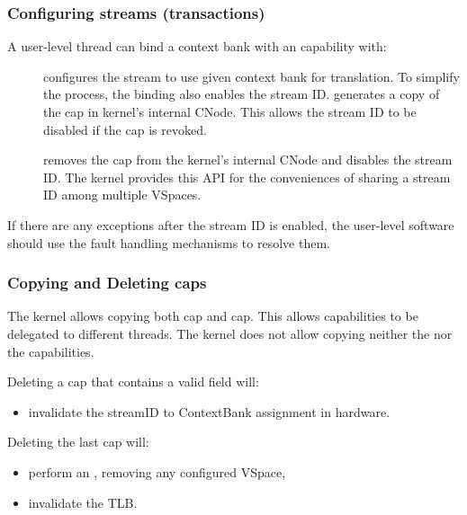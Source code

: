 \subsubsection{Configuring streams (transactions)}
\label{sec:smmuv2-configuring-streams-transactions}

A user-level thread can bind a context bank with an 
capability with:
\begin{description}
    \item[] configures the stream
        to use given context bank for translation. To simplify the process, the
        binding also enables the stream ID.  
        generates a copy of the  cap in kernel's internal
        CNode. This allows the stream ID to be disabled if the
         cap is revoked.
    \item[] removes the
         cap from the kernel's internal CNode and disables
        the stream ID. The kernel provides this API for the conveniences of
        sharing a stream ID among multiple VSpaces.
\end{description}

If there are any exceptions after the stream ID is enabled, the user-level
software should use the fault handling mechanisms to resolve them.



\subsubsection{Copying and Deleting caps}
\label{sec:smmuv2-copying-and-deleting-caps}
The kernel allows copying both  cap and  cap.
This allows capabilities to be delegated to different threads.
The kernel does not allow copying neither the  nor
the  capabilities.

Deleting a  cap that contains a valid  field will:
\begin{itemize}
    \item invalidate the streamID to ContextBank assignment in hardware.
\end{itemize}

Deleting the last  cap will:
\begin{itemize}
    \item perform an ,
    removing any configured VSpace,
    \item invalidate the TLB.
\end{itemize}

